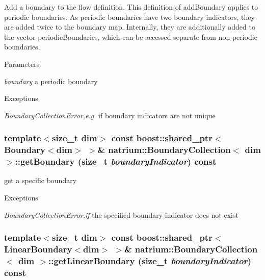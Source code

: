 Add a boundary to the flow definition. This definition of addBoundary applies to periodic boundaries. As periodic boundaries have two boundary indicators, they are added twice to the boundary map. Internally, they are additionally added to the vector periodicBoundaries, which can be accessed separate from non-\/periodic boundaries. 
\begin{DoxyParams}{Parameters}
\item[{\em boundary}]a periodic boundary \end{DoxyParams}

\begin{DoxyExceptions}{Exceptions}
\item[{\em BoundaryCollectionError,e.g.}]if boundary indicators are not unique \end{DoxyExceptions}
\hypertarget{classnatrium_1_1BoundaryCollection_a44816fa48b8100fb37b8ad7491c2cc6c}{
\subsubsection[{getBoundary}]{\setlength{\rightskip}{0pt plus 5cm}template$<$size\_\-t dim$>$ const boost::shared\_\-ptr$<${\bf Boundary}$<$dim$>$ $>$\& {\bf natrium::BoundaryCollection}$<$ dim $>$::getBoundary (size\_\-t {\em boundaryIndicator}) const}}
\label{classnatrium_1_1BoundaryCollection_a44816fa48b8100fb37b8ad7491c2cc6c}


get a specific boundary 
\begin{DoxyExceptions}{Exceptions}
\item[{\em BoundaryCollectionError,if}]the specified boundary indicator does not exist \end{DoxyExceptions}
\hypertarget{classnatrium_1_1BoundaryCollection_a1f2d415af1d71df84bbbcad218ccc79b}{
\subsubsection[{getLinearBoundary}]{\setlength{\rightskip}{0pt plus 5cm}template$<$size\_\-t dim$>$ const boost::shared\_\-ptr$<${\bf LinearBoundary}$<$dim$>$ $>$\& {\bf natrium::BoundaryCollection}$<$ dim $>$::getLinearBoundary (size\_\-t {\em boundaryIndicator}) const}}
\label{classnatrium_1_1BoundaryCollection_a1f2d415af1d71df84bbbcad218ccc79b}


